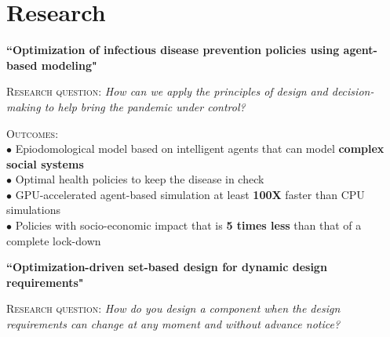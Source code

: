 \documentclass[10pt]{article} %
\begin{document}

\publications{}


\makeprofile %


\vspace{-\baselineskip} %

\section{Research}

{\raggedright\textbf{``Optimization of infectious disease prevention policies using agent-based modeling"}}

\textsc{Research question:} \textit{ How can we apply the principles of design and decision-making to help bring the pandemic under control?}

\textsc{Outcomes:}\vspace{-0.5em} ~~~~\\[1pt]

$\bullet$ Epiodomological model based on intelligent agents that can model \textbf{complex social systems}\\[1pt]
$\bullet$ Optimal health policies to keep the disease in check\\[1pt]
$\bullet$ GPU-accelerated agent-based simulation at least \textbf{100X} faster than CPU simulations\\[1pt]
$\bullet$ Policies with socio-economic impact that is \textbf{5 times less} than that of a complete lock-down

\medskip %

{\raggedright\textbf{``Optimization-driven set-based design for dynamic design requirements"}}

\textsc{Research question:} \textit{How do you design a component when the design requirements can change at any moment and without advance notice?}
\end{document}

